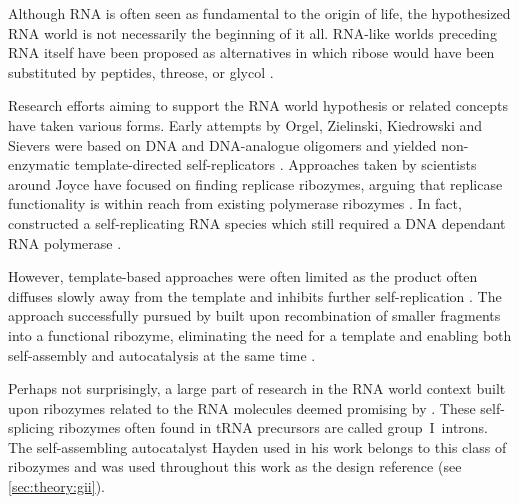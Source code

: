 \documentclass[../../master.tex]{subfiles}
\begin{document}
Although RNA is often seen as fundamental to the origin of life, the hypothesized RNA world is not necessarily the beginning of it all. 
RNA-like worlds preceding RNA itself have been proposed as alternatives in which ribose would have been substituted by peptides, threose, or glycol \parencite{robertson_origins_2012}.

Research efforts aiming to support the RNA world hypothesis or related concepts have taken various forms.
Early attempts by Orgel, Zielinski, Kiedrowski and Sievers were based on DNA and DNA-analogue oligomers and yielded non-enzymatic template-directed self-replicators \parencite{kiedrowski_self-replicating_1986, zielinski_autocatalytic_1987, sievers_self-replication_1994}.
Approaches taken by scientists around Joyce have focused on finding replicase ribozymes, arguing that replicase functionality is within reach from existing polymerase ribozymes \parencite{mcginness_search_2003, robertson_origins_2012}.
In fact, \citeauthor{breaker_emergence_1994} constructed a self-replicating RNA species which still required a DNA dependant RNA polymerase \parencite{breaker_emergence_1994}.

However, template-based approaches were often limited as the product often diffuses slowly away from the template and inhibits further self-replication \parencite{hayden_self-assembly_2006}.
The approach successfully pursued by \citeauthor{hayden_self-assembly_2006} built upon recombination of smaller fragments into a functional ribozyme, eliminating the need for a template and enabling both self-assembly and autocatalysis at the same time \parencite{hayden_self-assembly_2006}.

Perhaps not surprisingly, a large part of research in the RNA world context built upon ribozymes related to the RNA molecules deemed promising by \citeauthor{gilbert_origin_1986} \parencite{gilbert_origin_1986}. 
These self-splicing ribozymes often found in tRNA precursors are called group~I~introns.
The self-assembling autocatalyst Hayden used in his work belongs to this class of ribozymes and was used throughout this work as the design reference (see \autoref{sec:theory:gii}).



\end{document}
